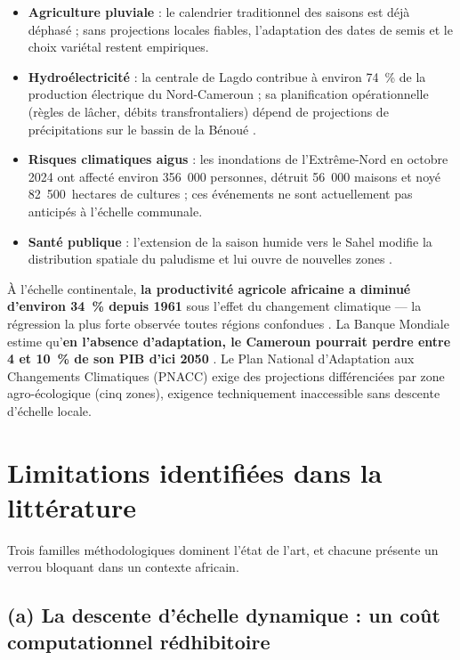 \documentclass[12pt,a4paper]{article}
\begin{document}
\begin{itemize}[leftmargin=1.2em, itemsep=2pt]
    \item \textbf{Agriculture pluviale} : le calendrier traditionnel des saisons est déjà déphasé ; sans projections locales fiables, l'adaptation des dates de semis et le choix variétal restent empiriques.
    \item \textbf{Hydroélectricité} : la centrale de Lagdo contribue à environ 74~\% de la production électrique du Nord-Cameroun ; sa planification opérationnelle (règles de lâcher, débits transfrontaliers) dépend de projections de précipitations sur le bassin de la Bénoué \cite{Nonki2021}.
    \item \textbf{Risques climatiques aigus} : les inondations de l'Extrême-Nord en octobre 2024 ont affecté environ 356~000 personnes, détruit 56~000 maisons et noyé 82~500~hectares de cultures \cite{OCHA2024} ; ces événements ne sont actuellement pas anticipés à l'échelle communale.
    \item \textbf{Santé publique} : l'extension de la saison humide vers le Sahel modifie la distribution spatiale du paludisme et lui ouvre de nouvelles zones \cite{Sokhna2022}.
\end{itemize}

À l'échelle continentale, \textbf{la productivité agricole africaine a diminué d'environ 34~\% depuis 1961} sous l'effet du changement climatique --- la régression la plus forte observée toutes régions confondues \cite{IPCC2022}. La Banque Mondiale estime qu'\textbf{en l'absence d'adaptation, le Cameroun pourrait perdre entre 4 et 10~\% de son PIB d'ici 2050} \cite{WB2022CCDR}. Le Plan National d'Adaptation aux Changements Climatiques (PNACC) exige des projections différenciées par zone agro-écologique (cinq zones), exigence techniquement inaccessible sans descente d'échelle locale.

\section{Limitations identifiées dans la littérature}

Trois familles méthodologiques dominent l'état de l'art, et chacune présente un verrou bloquant dans un contexte africain.

\subsection*{(a) La descente d'échelle dynamique : un coût computationnel rédhibitoire}
\end{document}

